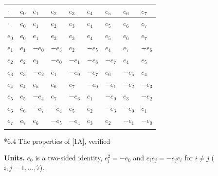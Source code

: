 \documentclass[10pt,a4paper]{article}
\makeatletter
\renewcommand\subsection{\@startsection{subsection}{2}{\z@}{-3.25ex\@plus -1ex \@minus -.2ex}{1.5ex \@plus .2ex}{\normalfont\large\bfseries\raggedright}}
\makeatother
\begin{document}
{\footnotesize
\begin{longtable}{>{\raggedright\arraybackslash}p{}>{\raggedright\arraybackslash}p{}>{\raggedright\arraybackslash}p{}>{\raggedright\arraybackslash}p{}>{\raggedright\arraybackslash}p{}>{\raggedright\arraybackslash}p{}>{\raggedright\arraybackslash}p{}>{\raggedright\arraybackslash}p{}>{\raggedright\arraybackslash}p{}}
\toprule
\textbf{$\cdot$} & \textbf{$e_{0}$} & \textbf{$e_{1}$} & \textbf{$e_{2}$} & \textbf{$e_{3}$} & \textbf{$e_{4}$} & \textbf{$e_{5}$} & \textbf{$e_{6}$} & \textbf{$e_{7}$} \\
\midrule\endfirsthead
\toprule
\textbf{$\cdot$} & \textbf{$e_{0}$} & \textbf{$e_{1}$} & \textbf{$e_{2}$} & \textbf{$e_{3}$} & \textbf{$e_{4}$} & \textbf{$e_{5}$} & \textbf{$e_{6}$} & \textbf{$e_{7}$} \\
\midrule\endhead
\endfoot
\bottomrule\endlastfoot
$e_{0}$ & $e_{0}$ & $e_{1}$ & $e_{2}$ & $e_{3}$ & $e_{4}$ & $e_{5}$ & $e_{6}$ & $e_{7}$ \\
$e_{1}$ & $e_{1}$ & $-e_{0}$ & $-e_{3}$ & $e_{2}$ & $-e_{5}$ & $e_{4}$ & $e_{7}$ & $-e_{6}$ \\
$e_{2}$ & $e_{2}$ & $e_{3}$ & $-e_{0}$ & $-e_{1}$ & $-e_{6}$ & $-e_{7}$ & $e_{4}$ & $e_{5}$ \\
$e_{3}$ & $e_{3}$ & $-e_{2}$ & $e_{1}$ & $-e_{0}$ & $-e_{7}$ & $e_{6}$ & $-e_{5}$ & $e_{4}$ \\
$e_{4}$ & $e_{4}$ & $e_{5}$ & $e_{6}$ & $e_{7}$ & $-e_{0}$ & $-e_{1}$ & $-e_{2}$ & $-e_{3}$ \\
$e_{5}$ & $e_{5}$ & $-e_{4}$ & $e_{7}$ & $-e_{6}$ & $e_{1}$ & $-e_{0}$ & $e_{3}$ & $-e_{2}$ \\
$e_{6}$ & $e_{6}$ & $-e_{7}$ & $-e_{4}$ & $e_{5}$ & $e_{2}$ & $-e_{3}$ & $-e_{0}$ & $e_{1}$ \\
$e_{7}$ & $e_{7}$ & $e_{6}$ & $-e_{5}$ & $-e_{4}$ & $e_{3}$ & $e_{2}$ & $-e_{1}$ & $-e_{0}$ \\*
\end{longtable}}
\subsection*{6.4 The properties of [1A], verified}
\textbf{Units.} $e_0$ is a two-sided identity, $e_i^2=-e_0$ and $e_ie_j=-e_je_i$ for $i\neq j$ ($i,j=1,\dots,7$).
\end{document}
